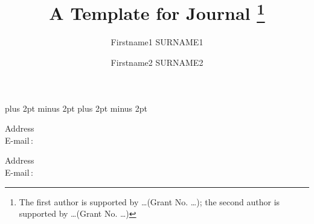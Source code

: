 \documentclass{amse-new}
\numberwithin{equation}{section} %
\begin{document}

\abovedisplayskip 6pt plus 2pt minus 2pt \belowdisplayskip 6pt
plus 2pt minus 2pt
\def\vsp{\vspace{1mm}}
\def\th#1{\vspace{1mm}\noindent{\bf #1}\quad}
\def\proof{\vspace{1mm}\noindent{\it Proof}\quad}
\def\no{\nonumber}
\newenvironment{prof}[1][Proof]{\noindent\textit{#1}\quad }
{\hfill $\Box$\vspace{0.7mm}}
\def\q{\quad} \def\qq{\qquad}
\allowdisplaybreaks[4]








\title{A Template for Journal        %
\footnote{The first author is supported by \ldots (Grant No. \ldots);
the second author is supported by \ldots (Grant No. \ldots)}}                  %

\author{Firstname1 \uppercase{Surname1}}             %
    {Address\\
    E-mail\,$:$ }

\author{Firstname2 SURNAME2}     %
    {Address\\
    E-mail\,$:$  }

\maketitle%


\end{document}
